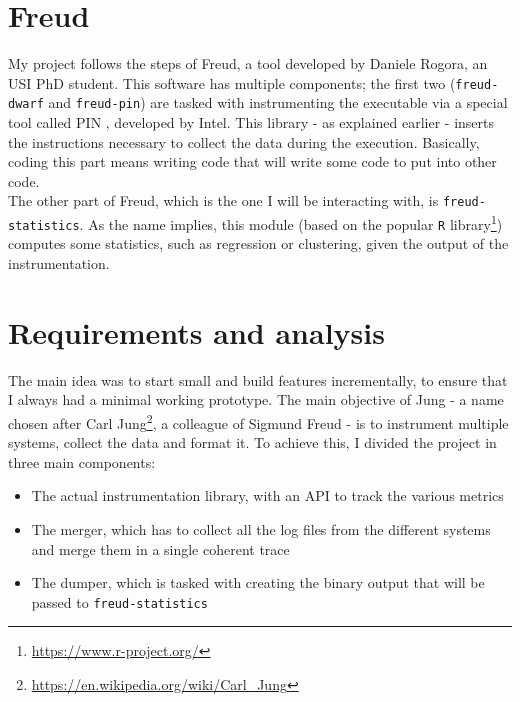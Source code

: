     \section{Freud}\label{sec:freud}


        My project follows the steps of Freud, a tool developed by Daniele Rogora, an USI PhD student.
        This software has multiple components; the first two (\texttt{freud-dwarf} and \texttt{freud-pin})
        are tasked with instrumenting the executable 
        via a special tool called PIN \cite{pin}, developed by Intel. This library - as explained earlier - 
        inserts the instructions necessary to collect the data during the execution. Basically, coding this
        part means writing code that will write some code to put into other code.\\

        The other part of Freud, which is the one I will be interacting with, is \texttt{freud-statistics}.
        As the name implies, this module (based on the popular \texttt{R} library\footnote{\url{https://www.r-project.org/}})
        computes some statistics, such as regression or clustering, given the output of the instrumentation.


    \section{Requirements and analysis}


        The main idea was to start small and build features incrementally, to ensure that I always
        had a minimal working prototype. The main objective of Jung - a name chosen after Carl
        Jung\footnote{\url{https://en.wikipedia.org/wiki/Carl_Jung}},
        a colleague of Sigmund Freud - is to instrument multiple systems, collect the data and format it.
        To achieve this, I divided the project in three main components:

        \begin{itemize}
            \item The actual instrumentation library, with an API to track the various metrics
            \item The merger, which has to collect all the log files from the different systems
             and merge them in a single coherent trace
            \item The dumper, which is tasked with creating the binary output that will be passed
             to \texttt{freud-statistics}
        \end{itemize}

